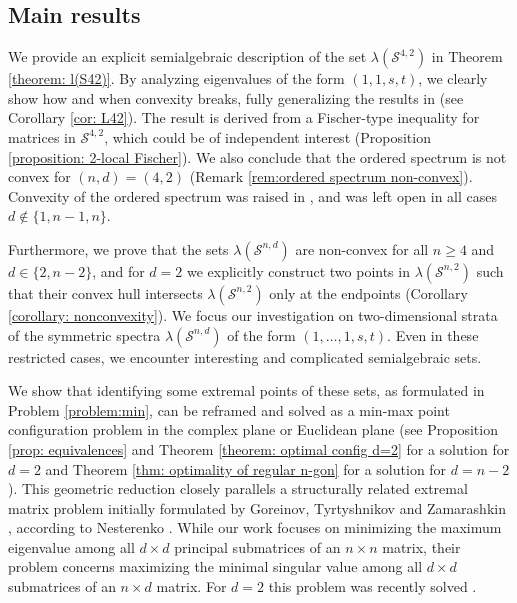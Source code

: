 \documentclass[reqno,hidelinks,11pt]{amsart}
\numberwithin{equation}{section}
\def\S{\mathcal{S}}
\begin{document}
\subsection*{Main results}

We provide an explicit semialgebraic description of the set $\lambda(\S^{4,2})$ in Theorem \ref{theorem: l(S42)}. By analyzing eigenvalues of the form $(1,1,s,t)$, we clearly show how and when convexity breaks, fully generalizing the results in \cite{kozhasov2023eigenvalues} (see Corollary \ref{cor: L42}). The result is derived from a Fischer-type inequality for matrices in $\S^{4,2}$, which could be of independent interest (Proposition \ref{proposition: 2-local Fischer}). We also conclude that the ordered spectrum is not convex for $(n,d)=(4,2)$ (Remark \ref{rem:ordered spectrum non-convex}). Convexity of the ordered spectrum was raised in \cite[Section~2]{kozhasov2023eigenvalues}, and was left open in all cases $d \notin \{1, n - 1, n\}$. 

Furthermore, we prove that the sets $\lambda(\S^{n,d})$ are non-convex for all $n \geq 4$ and $d \in \{2, n-2\}$, and for $d=2$ we explicitly construct two points in $\lambda(\S^{n,2})$ such that their convex hull intersects $\lambda(\S^{n,2})$ only at the endpoints (Corollary \ref{corollary: nonconvexity}). We focus our investigation on two-dimensional strata of the symmetric spectra $\lambda(\S^{n,d})$ of the form $(1,\ldots,1,s,t)$. Even in these restricted cases, we encounter interesting and complicated semialgebraic sets. 

We show that identifying some extremal points of these sets, as formulated in Problem \ref{problem:min}, can be reframed and solved as a min-max point configuration problem in the complex plane or Euclidean plane (see Proposition \ref{prop: equivalences} and Theorem \ref{theorem: optimal config d=2} for a solution for $d=2$ and Theorem \ref{thm: optimality of regular n-gon} for a solution for $d=n-2$). 
This geometric reduction closely parallels a structurally related extremal matrix problem initially formulated by Goreinov, Tyrtyshnikov and
Zamarashkin \cite{goreinov1997theory}, according to Nesterenko \cite{nesterenko2024submatrices}. While our work focuses on minimizing the maximum eigenvalue among all $d \times d$ principal submatrices of an $n \times n$ matrix, their problem concerns maximizing the minimal singular value among all $d \times d$ submatrices of an $n \times d$ matrix. 
For $d=2$ this problem was recently solved \cite{sengupta2026submatrices}. 
\end{document}
